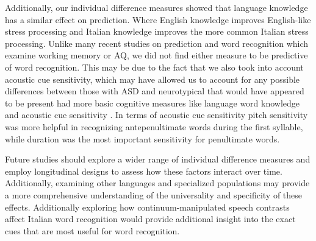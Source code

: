 Additionally, our individual difference measures showed that language knowledge has a similar effect on prediction. Where English knowledge improves English-like stress processing and Italian knowledge improves the more common Italian stress processing. Unlike many recent studies on prediction and word recognition which examine working memory or AQ, we did not find either measure to be predictive of word recognition. This may be due to the fact that we also took into account acoustic cue sensitivity, which may have allowed us to account for any possible differences between those with ASD and neurotypical that would have appeared to be present had more basic cognitive measures like language word knowledge and acoustic cue sensitivity \cite{grossman2023}. In terms of acoustic cue sensitivity pitch sensitivity was more helpful in recognizing antepenultimate words during the first syllable, while duration was the most important sensitivity for penultimate words.


Future studies should explore a wider range of individual difference measures and employ longitudinal designs to assess how these factors interact over time. Additionally, examining other languages and specialized populations may provide a more comprehensive understanding of the universality and specificity of these effects. Additionally exploring how continuum-manipulated speech contrasts affect Italian word recognition would provide additional insight into the exact cues that are most useful for word recognition.